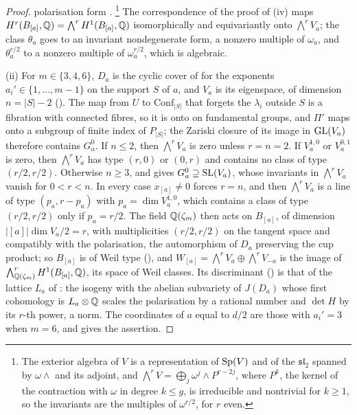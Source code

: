 \begin{proof}
polarisation form \cite[Theorem~17.5]{FH91}.%
\footnote{The exterior algebra of $V$ is a representation of $\operatorname{Sp}(V)$
and of the $\mathfrak{sl}_{2}$ spanned by $\omega\wedge{}$ and its adjoint,
and $\bigwedge^{r}V=\bigoplus_{j}\omega^{j}\wedge P^{r-2j}$, where $P^{k}$, the
kernel of the contraction with $\omega$ in degree $k\le g$, is irreducible
and nontrivial for $k\ge1$, so the invariants are the multiples of
$\omega^{r/2}$, for $r$ even.} The correspondence of the proof of
(iv) maps $H^{r}(B_{[a]},\mathbb{Q})=\bigwedge^{r}H^{1}(B_{[a]},
\mathbb{Q})$ isomorphically and equivariantly onto $\bigwedge^{r}V_{a}$; the class
$\theta_{a}$ goes to an invariant nondegenerate form, a nonzero multiple of
$\omega_{a}$, and $\theta_{a}^{r/2}$ to a nonzero multiple of
$\omega_{a}^{r/2}$, which is algebraic.

(ii) For $m\in\{3,4,6\}$, $D_{a}$ is the cyclic cover of 
for the exponents $a_{i}'\in\{1,\dots,m-1\}$ on the support $S$ of $a$, and
$V_{a}$ is its eigenspace, of dimension $n=|S|-2$ (). The
map from $U$ to $\mathrm{Conf}_{|S|}$ that forgets the $\lambda_{i}$ outside
$S$ is a fibration with connected fibres, so it is onto on fundamental groups,
and $\Pi'$ maps onto a subgroup of finite index of $P_{|S|}$; the Zariski
closure of its image in $\operatorname{GL}(V_{a})$ therefore contains $G_{a}^{0}$. If
$n\le2$, then $\bigwedge^{r}V_{a}$ is zero unless $r=n=2$. If $V_{a}^{1,0}$ or
$V_{a}^{0,1}$ is zero, then $\bigwedge^{r}V_{a}$ has type $(r,0)$ or $(0,r)$
and contains no class of type $(r/2,r/2)$. Otherwise $n\ge3$, and
 gives $G_{a}^{0}\supseteq\operatorname{SL}(V_{a})$, whose
invariants in $\bigwedge^{r}V_{a}$ vanish for $0<r<n$. In every case
$x_{[a]}\ne0$ forces $r=n$, and then $\bigwedge^{r}V_{a}$ is a line of type
$(p_{a},r-p_{a})$ with $p_{a}=\dim V_{a}^{1,0}$, which contains a class of type
$(r/2,r/2)$ only if $p_{a}=r/2$. The field $\mathbb{Q}(\zeta_{m})$ then acts on
$B_{[a]}$, of dimension $|[a]|\dim V_{a}/2=r$, with multiplicities
$(r/2,r/2)$ on the tangent space and compatibly with the polarisation, the
automorphism of $D_{a}$ preserving the cup product; so $B_{[a]}$ is of Weil
type (), and
$W_{[a]}=\bigwedge^{r}V_{a}\oplus\bigwedge^{r}V_{-a}$ is the image of
$\bigwedge^{r}_{\mathbb{Q}(\zeta_{m})}H^{1}(B_{[a]},\mathbb{Q})$, its space of Weil classes.
Its discriminant () is that of the lattice $L_{a}$ of
: the isogeny with the abelian subvariety of $J(D_{a})$
whose first cohomology is $L_{a}\otimes\mathbb{Q}$ scales the polarisation by a
rational number and $\det H$ by its $r$-th power, a norm. The coordinates of
$a$ equal to $d/2$ are those with $a_{i}'=3$ when $m=6$, and
 gives the assertion.


\end{proof}
